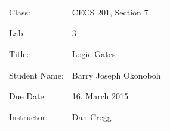\documentclass[9pt]{article}
\begin{document}
\vspace*{\fill}
\begin{center}
{\Huge \begin{tabular}{@{}ll@{}}
   Class: & CECS 201, Section 7 \\ \\ \\
   Lab: & 3 \\ \\ \\
   Title: & Logic Gates \\ \\ \\
   Student Name: & Barry Joseph Okonoboh \\ \\ \\
   Due Date: & 16, March 2015 \\ \\ \\
   Instructor: & Dan Cregg
\end{tabular}}
\end{center}
\vspace*{\fill}
\newpage
\end{document}
